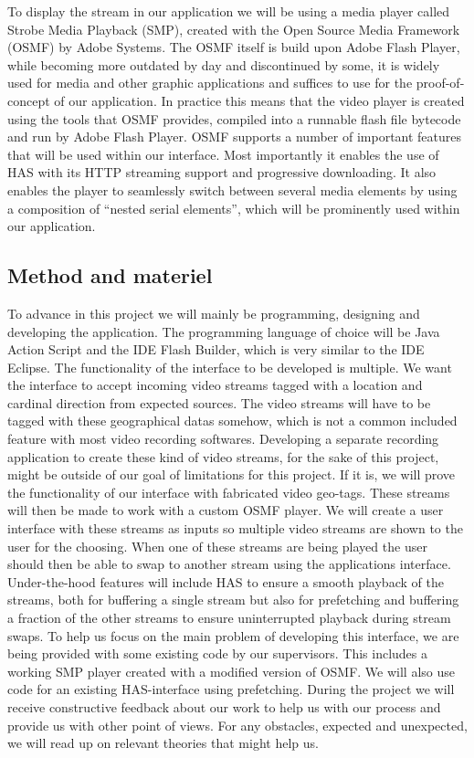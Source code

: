 \documentclass[9pt,a4paper]{acmproc}
\begin{document}
To display the stream in our application we will be using a media player called Strobe Media Playback (SMP), created with the Open Source Media Framework (OSMF) by Adobe Systems. The OSMF itself is build upon Adobe Flash Player, while becoming more outdated by day and discontinued by some, it is widely used for media and other graphic applications and suffices to use for the proof-of-concept of our application. In practice this means that the video player is created using the tools that OSMF provides, compiled into a runnable flash file bytecode and run by Adobe Flash Player. 
OSMF supports a number of important features that will be used within our interface. Most importantly it enables the use of HAS with its HTTP streaming support and progressive downloading. It also enables the player to seamlessly switch between several media elements by using a composition of “nested serial elements”, which will be prominently used within our application.\cite{osmf}

\subsection{Method and materiel}
To advance in this project we will mainly be programming, designing and developing the application. The programming language of choice will be Java Action Script and the IDE Flash Builder, which is very similar to the IDE Eclipse. The functionality of the interface to be developed is multiple. We want the interface to accept incoming video streams tagged with a location and cardinal direction from expected sources. The video streams will have to be tagged with these geographical datas somehow, which is not a common included feature with most video recording softwares. Developing a separate recording application to create these kind of video streams, for the sake of this project, might be outside of our goal of limitations for this project. If it is, we will prove the functionality of our interface with fabricated video geo-tags. These streams will then be made to work with a custom OSMF player. We will create a user interface with these streams as inputs so multiple video streams are shown to the user for the choosing. When one of these streams are being played the user should then be able to swap to another stream using the applications interface. 
Under-the-hood features will include HAS to ensure a smooth playback of the streams, both for buffering a single stream but also for prefetching and buffering a fraction of the other streams to ensure uninterrupted playback during stream swaps. 
To help us focus on the main problem of developing this interface, we are being provided with some existing code by our supervisors. This includes a working SMP player created with a modified version of OSMF. We will also use code for an existing HAS-interface using prefetching. \cite[p.~317-326]{qualbranch}
During the project we will receive constructive feedback about our work to help us with our process and provide us with other point of views. For any obstacles, expected and unexpected, we will read up on relevant theories that might help us.
\end{document}
